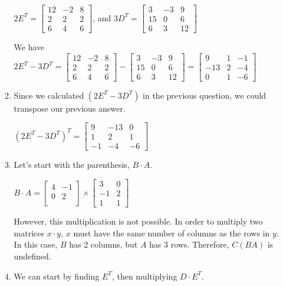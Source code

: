 \documentclass[11pt, letterpaper, twoside]{article}
\begin{document}
\begin{enumerate}
\begin{enumerate}[label=(\alph*)]
$2E^T=\begin{bmatrix}
12 & -2 & 8\\
2 & 2 & 2\\
6 & 4 & 6
\end{bmatrix}$, and $3D^T=\begin{bmatrix}
3 & -3 & 9\\
15 & 0 & 6\\
6 & 3 &12
\end{bmatrix}$

We have $2E^T-3D^T=\begin{bmatrix}
12 & -2 & 8\\
2 & 2 & 2\\
6 & 4 & 6
\end{bmatrix}-
\begin{bmatrix}
3 & -3 & 9\\
15 & 0 & 6\\
6 & 3 &12
\end{bmatrix}
=\begin{bmatrix}
9 & 1 & -1\\
-13 & 2 & -4\\
0 & 1 & -6
\end{bmatrix}$
\item Since we calculated $(2E^T-3D^T)$ in the previous question, we could transpose our previous answer.

$(2E^T-3D^T)^T=\begin{bmatrix}
9 & -13 & 0\\
1 & 2 & 1\\
-1 & -4 & -6
\end{bmatrix}$

\item Let's start with the parenthesis, $B\cdot A$.

$B\cdot A = \begin{bmatrix}
4 & -1\\
0 & 2\\
\end{bmatrix} \times
\begin{bmatrix}
3 & 0\\
-1 & 2\\
1 & 1
\end{bmatrix}$

However, this multiplication is not possible. In order to multiply two matrices $x\cdot y$, $x$ must have the same number of columns as the rows in $y$. In this case, $B$ has 2 columns, but $A$ has 3 rows. Therefore, $C(BA)$ is undefined.

\item We can start by finding $E^T$, then multiplying $D\cdot E^T$.


\end{enumerate}
\end{enumerate}
\end{document}
